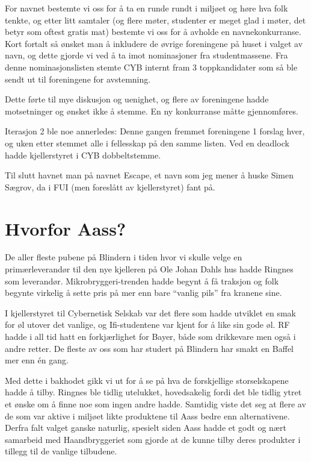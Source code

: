 For navnet bestemte vi oss for å ta en runde rundt i miljøet og høre hva folk tenkte, og etter litt samtaler (og flere møter, studenter er meget glad i møter, det betyr som oftest gratis mat) bestemte vi oss for å avholde en navnekonkurranse. Kort fortalt så ønsket man å inkludere de øvrige foreningene på huset i valget av navn, og dette gjorde vi ved å ta imot nominasjoner fra studentmassene. Fra denne nominasjonslisten stemte CYB internt fram 3 toppkandidater som så ble sendt ut til foreningene for avstemning.

Dette førte til mye diskusjon og uenighet, og flere av foreningene hadde motsetninger og ønsket ikke å stemme. En ny konkurranse måtte gjennomføres.

Iterasjon 2 ble noe annerledes: Denne gangen fremmet foreningene 1 forslag hver, og uken etter stemmet alle i fellesskap på den samme listen. Ved en deadlock hadde kjellerstyret i CYB dobbeltstemme.

Til slutt havnet man på navnet Escape, et navn som jeg mener å huske Simen Sægrov, da i FUI (men foreslått av kjellerstyret) fant på.

\section{Hvorfor Aass?}

De aller fleste pubene på Blindern i tiden hvor vi skulle velge en primærleverandør til den nye kjelleren på Ole Johan Dahls hus hadde Ringnes som leverandør. Mikrobryggeri-trenden hadde begynt å få traksjon og folk begynte virkelig å sette pris på mer enn bare ``vanlig pils'' fra kranene sine.

I kjellerstyret til Cybernetisk Selskab var det flere som hadde utviklet en smak for øl utover det vanlige, og Ifi-studentene var kjent for å like sin gode øl. RF hadde i all tid hatt en forkjærlighet for Bayer, både som drikkevare men også i andre retter. De fleste av oss som har studert på Blindern har smakt en Baffel mer enn én gang.

Med dette i bakhodet gikk vi ut for å se på hva de forskjellige storselskapene hadde å tilby. Ringnes ble tidlig utelukket, hovedsakelig fordi det ble tidlig ytret et ønske om å finne noe som ingen andre hadde. Samtidig viste det seg at flere av de som var aktive i miljøet likte produktene til Aass bedre enn alternativene. Derfra falt valget ganske naturlig, spesielt siden Aass hadde et godt og nært samarbeid med Haandbryggeriet som gjorde at de kunne tilby deres produkter i tillegg til de vanlige tilbudene.

